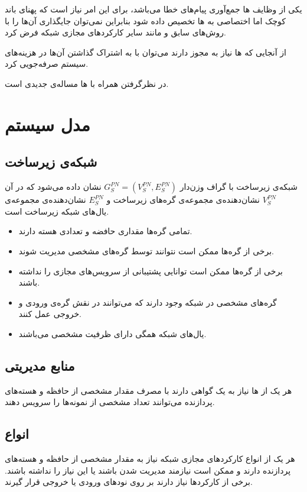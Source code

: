 یکی از وظایف ها جمع‌آوری پیام‌های خطا می‌باشد،
برای این امر نیاز است که پهنای باند کوچک اما اختصاصی به ها
تخصیص داده شود بنابراین نمی‌توان جایگذاری آن‌ها را با روش‌های سابق و مانند سایر
کارکردهای مجازی شبکه فرض کرد.

از آنجایی که ها نیاز به مجوز دارند می‌توان با به اشتراک گذاشتن آن‌ها در هزینه‌های سیستم صرفه‌جویی کرد.

در نظرگرفتن  همراه با ها مساله‌ی جدیدی است.

\section{مدل سیستم}
\subsection{شبکه‌ی زیرساخت}
شبکه‌ی زیرساخت با گراف وزن‌دار
\(G_S^{PN} = (V_S^{PN}, E_S^{PN})\)
نشان داده می‌شود
که در آن
\(V_S^{PN}\)
نشان‌دهنده‌ی مجموعه‌ی گره‌های زیرساخت
و
\(E_S^{PN}\)
نشان‌دهنده‌ی مجموعه‌ی یال‌های شبکه زیرساخت
است.

\begin{itemize}
    \item تمامی گره‌ها مقداری حافضه و تعدادی هسته دارند.
    \item برخی از گره‌ها ممکن است نتوانند توسط گره‌های مشخصی مدیریت شوند.
    \item برخی از گره‌ها ممکن است توانایی پشتیبانی از سرویس‌های مجازی را نداشته باشند.
    \item گره‌های مشخصی در شبکه وجود دارند که می‌توانند در نقش گره‌ی ورودی و خروجی عمل کنند.
    \item یال‌های شبکه همگی دارای ظرفیت مشخصی می‌باشند.
\end{itemize}

\subsection{منابع مدیریتی}
هر یک از
‌ها
نیاز به یک گواهی دارند با مصرف مقدار مشخصی از حافظه و هسته‌های پردازنده
می‌توانند تعداد مشخصی از نمونه‌ها را سرویس دهند.

\subsection{انواع}
هر یک از انواع کارکردهای مجازی شبکه
نیاز به مقدار مشخصی از حافظه و هسته‌های پردازنده دارند
و ممکن است نیازمند مدیریت شدن باشند یا این نیاز را نداشته باشند.
برخی از کارکردها نیاز دارند بر روی نودهای ورودی یا خروجی قرار گیرند.

